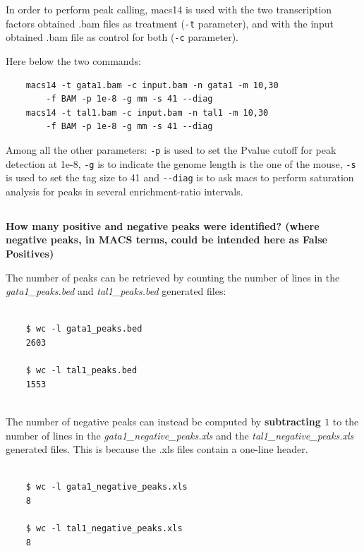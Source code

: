 \documentclass[12pt, a4paper]{article}
\begin{document}
	In order to perform peak calling, macs14 is used with the two transcription factors obtained .bam files as treatment (\verb|-t| parameter), and with the input obtained .bam file as control for both (\verb|-c| parameter).
	
	Here below the two commands:
	
	\begin{verbatim}
	macs14 -t gata1.bam -c input.bam -n gata1 -m 10,30
	    -f BAM -p 1e-8 -g mm -s 41 --diag
	macs14 -t tal1.bam -c input.bam -n tal1 -m 10,30
	    -f BAM -p 1e-8 -g mm -s 41 --diag
	\end{verbatim}
	
	Among all the other parameters: \verb|-p| is used to set the Pvalue cutoff for peak detection at 1e-8, \verb|-g| is to indicate the genome length is the one of the mouse, \verb|-s| is used to set the tag size to 41 and \verb|--diag| is to ask macs to perform saturation analysis for peaks in several enrichment-ratio intervals.
	
	\subsection{}
	\textbf{How many positive and negative peaks were identified? (where negative peaks, in MACS terms, could be intended here as False Positives)}
	
	The number of peaks can be retrieved by counting the number of lines in the \textit{gata1\_peaks.bed} and \textit{tal1\_peaks.bed} generated files:
	
	\begin{verbatim}
	
	$ wc -l gata1_peaks.bed
	2603
	
	$ wc -l tal1_peaks.bed
	1553
	
	\end{verbatim}
	
	The number of negative peaks can instead be computed by \textbf{subtracting $1$} to the number of lines in the \textit{gata1\_negative\_peaks.xls} and the \textit{tal1\_negative\_peaks.xls} generated files. This is because the .xls files contain a one-line header.
	
	\begin{verbatim}
	
	$ wc -l gata1_negative_peaks.xls
	8
	
	$ wc -l tal1_negative_peaks.xls
	8
	
	\end{verbatim}
	
\end{document}
